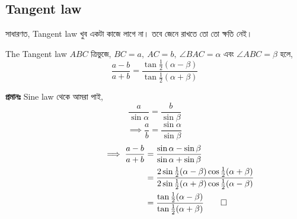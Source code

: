 \documentclass[12pt]{article}
\begin{document}
\subsection{Tangent law}
সাধারণত, Tangent law খুব একটা কাজে লাগে না। তবে জেনে রাখতে তো তো ক্ষতি নেই। 
\begin{theom}{The Tangent law}
    $ABC$ ত্রিভুজে, $BC = a, \ AC = b, \ \angle BAC = \alpha$ এবং $\angle ABC = \beta$ হলে,
    $${\displaystyle {\frac {a-b}{a+b}}={\frac {\tan {\tfrac {1}{2}}(\alpha -\beta )}{\tan {\tfrac {1}{2}}(\alpha +\beta )}}}$$
\end{theom}
\begin{sol}
    \textbf{প্রমানঃ} Sine law থেকে আমরা পাই, 
    $$\frac{a}{\sin \alpha} = \frac{b}{\sin \beta}$$
    $$\implies \frac{a}{b} = \frac{\sin \alpha}{\sin \beta}$$
    \begin{align*}
        \qquad \qquad \qquad \implies \frac{a-b}{a+b} &= \frac{\sin \alpha - \sin \beta}{\sin \alpha + \sin \beta}\\
        &= \frac{2\sin \tfrac {1}{2}(\alpha -\beta )\cos \tfrac {1}{2}(\alpha +\beta )}{2\sin \tfrac {1}{2}(\alpha +\beta )\cos \tfrac {1}{2}(\alpha -\beta )}\\
        &= \frac {\tan {\tfrac {1}{2}}(\alpha -\beta )}{\tan {\tfrac {1}{2}}(\alpha +\beta )} \qed
    \end{align*}
\end{sol}
\end{document}
